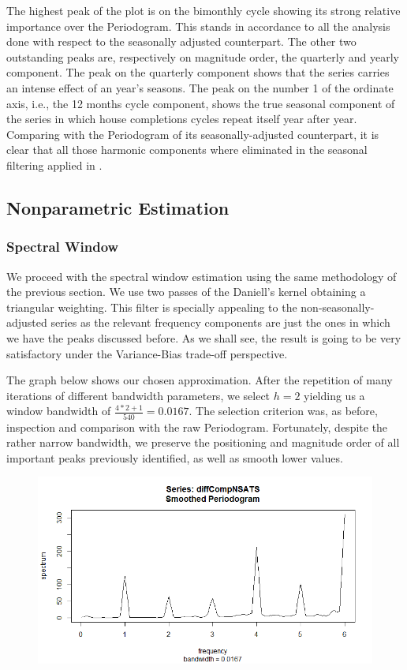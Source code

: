 \documentclass[12pt]{article} %
\begin{document}
The highest peak of the plot is on the bimonthly cycle showing its strong relative importance over the Periodogram. This stands in accordance to all the analysis done with respect to the seasonally adjusted counterpart. The other two outstanding peaks are, respectively on magnitude order, the quarterly and yearly component. The peak on the quarterly component shows that the series carries an intense effect of an year's seasons. The peak on the number 1 of the ordinate axis, i.e., the 12 months cycle component, shows the true seasonal component of the series in which house completions cycles repeat itself year after year. Comparing with the Periodogram of its seasonally-adjusted counterpart, it is clear that all those harmonic components where eliminated in the seasonal filtering applied in \cite{dataset}.


\subsection{Nonparametric Estimation}

\subsubsection{Spectral Window}

We proceed with the spectral window estimation using the same methodology of the previous section. We use two passes of the Daniell's kernel obtaining a triangular weighting. This filter is specially appealing to the non-seasonally-adjusted series as the relevant frequency components are just the ones in which we have the peaks discussed before. As we shall see, the result is going to be very satisfactory under the Variance-Bias trade-off perspective. 

The graph below shows our chosen approximation. After the repetition of many iterations of different bandwidth parameters, we select $h=2$ yielding us a window bandwidth of $\frac{4*2+1}{540} = 0.0167$. The selection criterion was, as before, inspection and comparison with the raw Periodogram. Fortunately, despite the rather narrow bandwidth, we preserve the positioning and magnitude order of all important peaks previously identified, as well as smooth lower values.

\begin{figure}[h!]
\begin{center}
\includegraphics[scale=0.5]{spec22}
\caption{}
\end{center}
\end{figure}
\end{document}
